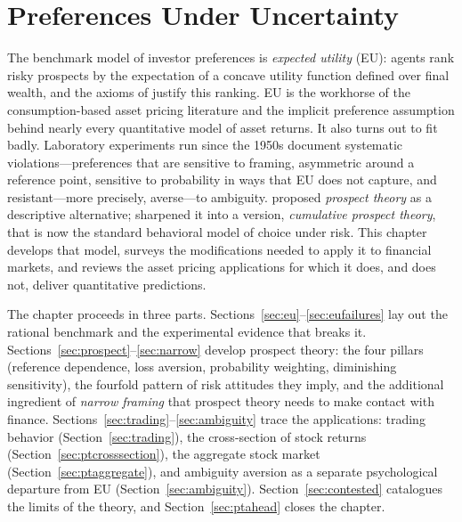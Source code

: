 \chapter{Preferences Under Uncertainty}
\label{ch:preferences}

The benchmark model of investor preferences is \emph{expected utility} (EU): agents rank risky prospects by the expectation of a concave utility function defined over final wealth, and the axioms of \citet{vonNeumannMorgenstern1944} justify this ranking. EU is the workhorse of the consumption-based asset pricing literature and the implicit preference assumption behind nearly every quantitative model of asset returns. It also turns out to fit badly. Laboratory experiments run since the 1950s document systematic violations---preferences that are sensitive to framing, asymmetric around a reference point, sensitive to probability in ways that EU does not capture, and resistant---more precisely, averse---to ambiguity. \citet{kahneman1979} proposed \emph{prospect theory} as a descriptive alternative; \citet{tversky1992} sharpened it into a version, \emph{cumulative prospect theory}, that is now the standard behavioral model of choice under risk. This chapter develops that model, surveys the modifications needed to apply it to financial markets, and reviews the asset pricing applications for which it does, and does not, deliver quantitative predictions.

The chapter proceeds in three parts. Sections~\ref{sec:eu}--\ref{sec:eufailures} lay out the rational benchmark and the experimental evidence that breaks it. Sections~\ref{sec:prospect}--\ref{sec:narrow} develop prospect theory: the four pillars (reference dependence, loss aversion, probability weighting, diminishing sensitivity), the fourfold pattern of risk attitudes they imply, and the additional ingredient of \emph{narrow framing} that prospect theory needs to make contact with finance. Sections~\ref{sec:trading}--\ref{sec:ambiguity} trace the applications: trading behavior (Section~\ref{sec:trading}), the cross-section of stock returns (Section~\ref{sec:ptcrosssection}), the aggregate stock market (Section~\ref{sec:ptaggregate}), and ambiguity aversion as a separate psychological departure from EU (Section~\ref{sec:ambiguity}). Section~\ref{sec:contested} catalogues the limits of the theory, and Section~\ref{sec:ptahead} closes the chapter.

